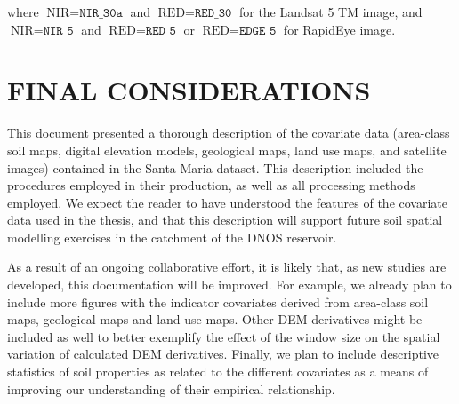 \noindent where $\text{NIR} = \texttt{NIR\_30a}$ and $\text{RED} = \texttt{RED\_30}$ for the Landsat 5 TM 
image, and 
$\text{NIR} = \texttt{NIR\_5}$ and $\text{RED} = \texttt{RED\_5}$ or $\text{RED} = \texttt{EDGE\_5}$ for 
RapidEye 
image.

\section{FINAL CONSIDERATIONS}

This document presented a thorough description of the covariate data (area-class soil maps, digital elevation 
models, geological maps, land use maps, and satellite images) contained in the Santa Maria dataset. This 
description included the procedures employed in their production, as well as all processing methods employed. 
We expect the reader to have understood the features of the covariate data used in the thesis, and that this 
description will support future soil spatial modelling exercises in the catchment of the DNOS reservoir.

As a result of an ongoing collaborative effort, it is likely that, as new studies are developed, this 
documentation will be improved. For example, we already plan to include more figures with the indicator 
covariates derived from area-class soil maps, geological maps and land use maps. Other DEM derivatives might be 
included as well to better exemplify the effect of the window size on the spatial variation of calculated DEM 
derivatives. Finally, we plan to include descriptive statistics of soil properties as related to the different 
covariates as a means of improving our understanding of their empirical relationship.
